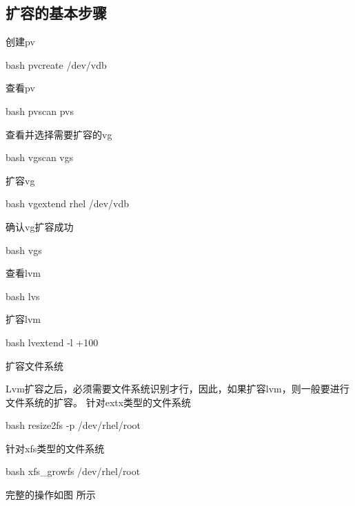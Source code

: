 \subsection{扩容的基本步骤}
\begin{outline}[enumerate]
  \1 创建pv
\begin{code-in-enumerate}{bash}
pvcreate /dev/vdb
\end{code-in-enumerate}

  \1 查看pv
\begin{code-in-enumerate}{bash}
pvscan
pvs
\end{code-in-enumerate}

  \1 查看并选择需要扩容的vg
\begin{code-in-enumerate}{bash}
vgscan
vgs
\end{code-in-enumerate}

  \1 扩容vg
\begin{code-in-enumerate}{bash}
vgextend rhel /dev/vdb
\end{code-in-enumerate}

  \1 确认vg扩容成功
\begin{code-in-enumerate}{bash}
vgs
\end{code-in-enumerate}

  \1 查看lvm
\begin{code-in-enumerate}{bash}
lvs
\end{code-in-enumerate}

  \1 扩容lvm
\begin{code-in-enumerate}{bash}
lvextend -l +100%
\end{code-in-enumerate}

  \1 扩容文件系统

      Lvm扩容之后，必须需要文件系统识别才行，因此，如果扩容lvm，则一般要进行文件系统的扩容。
      针对extx类型的文件系统
\begin{code-in-enumerate}{bash}
resize2fs -p /dev/rhel/root
\end{code-in-enumerate}

      针对xfs类型的文件系统
\begin{code-in-enumerate}{bash}
xfs_growfs /dev/rhel/root
\end{code-in-enumerate}

\end{outline}
完整的操作如图 所示
